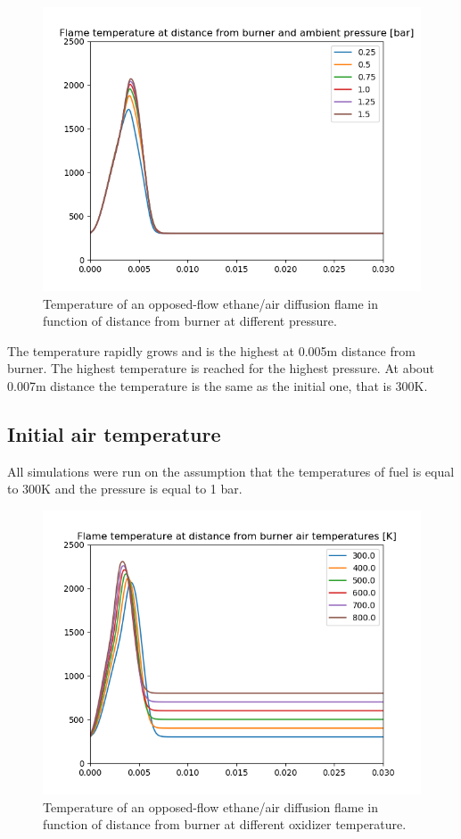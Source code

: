 \documentclass[a4paper]{article}
\newcommand{\sepspace}{\vspace*{1em}}
\begin{document}
\begin{figure} [h]
\includegraphics[width=1\textwidth]{c2h6_diffusion_pressure.png}
\caption{\label{fig:1}Temperature of an opposed-flow ethane/air diffusion flame in function of distance from burner at different pressure.}
\end{figure}

\sepspace
The temperature rapidly grows and is the highest at 0.005m distance from burner. The highest temperature is reached for the highest pressure. At about 0.007m distance the temperature is the same as the initial one, that is 300K.

\pagebreak

\subsection{Initial air temperature}
All simulations were run on the assumption that the temperatures of fuel is equal to 300K and the pressure is equal to 1 bar. 



\begin{figure}[h]
\centering
\includegraphics[width=1\textwidth]{c2h6_diffusion_temperature.png}
\caption{\label{fig:2}Temperature of an opposed-flow ethane/air diffusion flame in function of distance from burner at different oxidizer temperature.}
\end{figure}
\end{document}
